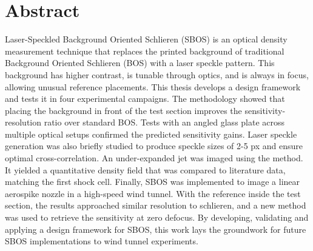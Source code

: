 \chapter*{Abstract}


Laser-Speckled Background Oriented Schlieren (SBOS) is an optical density measurement technique that replaces the printed background of traditional Background Oriented Schlieren (BOS) with a laser speckle pattern. This background has higher contrast, is tunable through optics, and is always in focus, allowing unusual reference placements. This thesis develops a design framework and tests it in four experimental campaigns. The methodology showed that placing the background in front of the test section improves the sensitivity-resolution ratio over standard BOS. Tests with an angled glass plate across multiple optical setups confirmed the predicted sensitivity gains. Laser speckle generation was also briefly studied to produce speckle sizes of 2-5 px and ensure optimal cross-correlation. An under-expanded jet was imaged using the method. It yielded a quantitative density field that was compared to literature data, matching the first shock cell. Finally, SBOS was implemented to image a linear aerospike nozzle in a high-speed wind tunnel. With the reference inside the test section, the results approached similar resolution to schlieren, and a new method was used to retrieve the sensitivity at zero defocus. By developing, validating and applying a design framework for SBOS, this work lays the groundwork for future SBOS implementations to wind tunnel experiments.